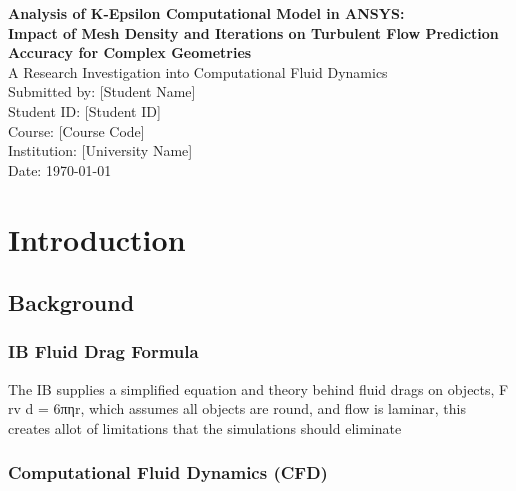\documentclass[12pt,a4paper]{article}
\begin{document}
\begin{titlepage}
\centering
\vspace*{2cm}
{\LARGE\bfseries Analysis of K-Epsilon Computational Model in ANSYS:\\[0.5cm] 
Impact of Mesh Density and Iterations on Turbulent Flow Prediction Accuracy for Complex Geometries}\\[2cm]

{\large A Research Investigation into Computational Fluid Dynamics}\\[1.5cm]

{\large Submitted by: [Student Name]}\\[0.5cm]
{\large Student ID: [Student ID]}\\[0.5cm]
{\large Course: [Course Code]}\\[0.5cm]
{\large Institution: [University Name]}\\[1.5cm]

{\large Date: \today}\\[2cm]

\vfill
\end{titlepage}

\newpage
\tableofcontents
\newpage

\listoffigures
\newpage

\listoftables
\newpage

\section{Introduction}

\subsection{Background}

\subsubsection{IB Fluid Drag Formula}

The IB supplies a simplified equation and theory behind fluid drags on objects, F rv d = 6πηr, which assumes all objects are round, and flow is laminar, this creates allot of limitations that the simulations should eliminate

\subsubsection{Computational Fluid Dynamics (CFD)}
\end{document}
